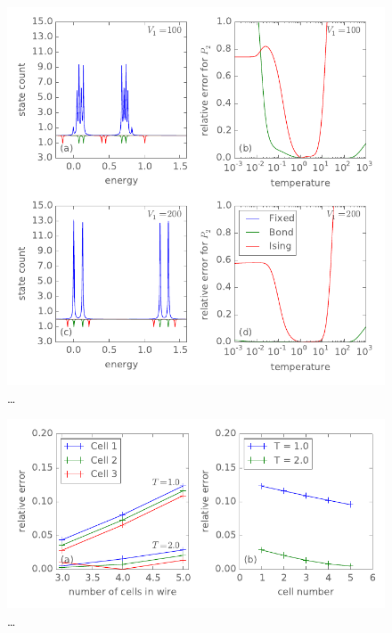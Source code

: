 \begin{figure}
  \center
  \includegraphics{ising_approximation2}
  \caption{\ldots}
  \label{fig:ising_approximation2}
\end{figure}

\begin{figure}
  \center
  \includegraphics{ising_approximation3}
  \caption{\ldots}
  \label{fig:ising_approximation3}
\end{figure}
